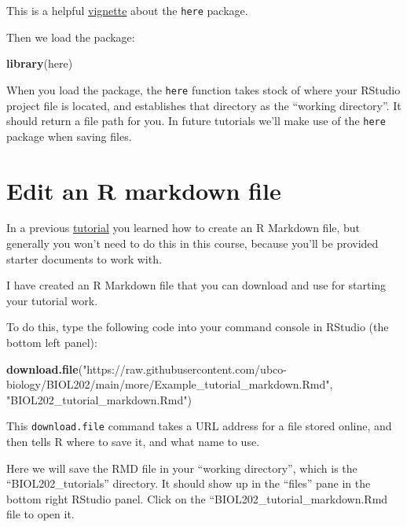 \documentclass[
]{book}
\newenvironment{Shaded}{\begin{snugshade}}{\end{snugshade}}
\newcommand{\FunctionTok}[1]{\textcolor[rgb]{0.13,0.29,0.53}{\textbf{#1}}}
\newcommand{\NormalTok}[1]{#1}
\newcommand{\StringTok}[1]{\textcolor[rgb]{0.31,0.60,0.02}{#1}}
\begin{document}
This is a helpful \href{https://here.r-lib.org/index.html}{vignette} about the \texttt{here} package.

Then we load the package:

\begin{Shaded}
\begin{Highlighting}[]
\FunctionTok{library}\NormalTok{(here)}
\end{Highlighting}
\end{Shaded}

When you load the package, the \texttt{here} function takes stock of where your RStudio project file is located, and establishes that directory as the ``working directory''. It should return a file path for you. In future tutorials we'll make use of the \texttt{here} package when saving files.

\section{Edit an R markdown file}\label{edit_markdown}

In a previous \hyperref[intro_markdown]{tutorial} you learned how to create an R Markdown file, but generally you won't need to do this in this course, because you'll be provided starter documents to work with.

I have created an R Markdown file that you can download and use for starting your tutorial work.

To do this, type the following code into your command console in RStudio (the bottom left panel):

\begin{Shaded}
\begin{Highlighting}[]
\FunctionTok{download.file}\NormalTok{(}\StringTok{"https://raw.githubusercontent.com/ubco{-}biology/BIOL202/main/more/Example\_tutorial\_markdown.Rmd"}\NormalTok{, }\StringTok{"BIOL202\_tutorial\_markdown.Rmd"}\NormalTok{)}
\end{Highlighting}
\end{Shaded}

This \texttt{download.file} command takes a URL address for a file stored online, and then tells R where to save it, and what name to use.

Here we will save the RMD file in your ``working directory'', which is the ``BIOL202\_tutorials'' directory. It should show up in the ``files'' pane in the bottom right RStudio panel. Click on the ``BIOL202\_tutorial\_markdown.Rmd file to open it.
\end{document}
